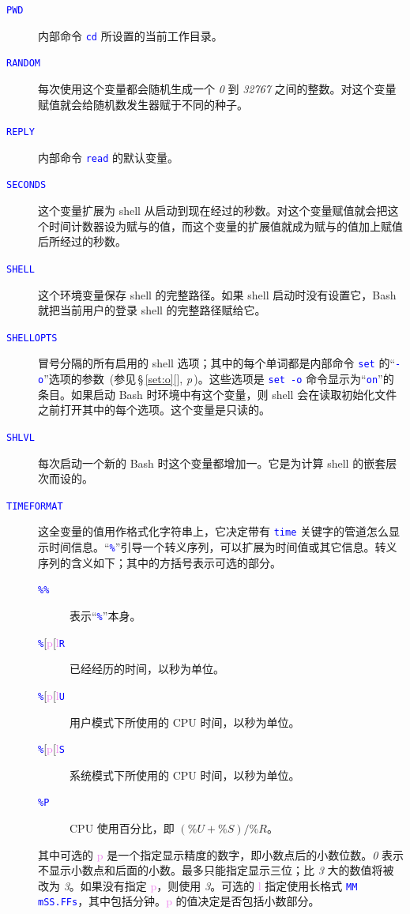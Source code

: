 \documentclass[openany,notitlepage]{book}
\newcommand{\code}[1]{\textcolor{blue}{{\tt #1}}}
\newcommand{\hl}[1]{{\sl #1}}
\newcommand{\hs}[1]{{\textcolor{violet}{#1}}}
\newcommand{\fullref}[1]{\,\S\,\ref{#1}[\nameref{#1}], \textit{p\pageref{#1}}\,}
\begin{document}
\begin{CJK}{UTF8}{song}
\begin{description}
    \item[\code{PWD}] 内部命令 \code{cd} 所设置的当前工作目录。
    \item[\code{RANDOM}] 每次使用这个变量都会随机生成一个 \hl{0} 到 \hl{32767} 之间的整数。对这个变量赋值就会给随机数发生器赋于不同的种子。
    \item[\code{REPLY}] 内部命令 \code{read} 的默认变量。
    \item[\code{SECONDS}] 这个变量扩展为 shell 从启动到现在经过的秒数。对这个变量赋值就会把这个时间计数器设为赋与的值，而这个变量的扩展值就成为赋与的值加上赋值后所经过的秒数。
    \item[\code{SHELL}] 这个环境变量保存 shell 的完整路径。如果 shell 启动时没有设置它，Bash 就把当前用户的登录 shell 的完整路径赋给它。
    \item[\code{SHELLOPTS}] 冒号分隔的所有启用的 shell 选项；其中的每个单词都是内部命令 \code{set} 的``\code{-o}''选项的参数~(参见\fullref{set:o})。这些选项是 \code{set -o} 命令显示为``\code{on}''的条目。如果启动 Bash 时环境中有这个变量，则 shell 会在读取初始化文件之前打开其中的每个选项。这个变量是只读的。
    \item[\code{SHLVL}] 每次启动一个新的 Bash 时这个变量都增加一。它是为计算 shell 的嵌套层次而设的。
    \item[\code{TIMEFORMAT}] 这全变量的值用作格式化字符串上，它决定带有 \code{time} 关键字的管道怎么显示时间信息。``\code{\%}''引导一个转义序列，可以扩展为时间值或其它信息。转义序列的含义如下；其中的方括号表示可选的部分。
    \begin{description}
        \item[\code{\%\%}] 表示``\code{\%}''本身。
        \item[\code{\%}[\hs{p}[\hs{l}\code{R}] 已经经历的时间，以秒为单位。
        \item[\code{\%}[\hs{p}[\hs{l}\code{U}] 用户模式下所使用的 CPU 时间，以秒为单位。
        \item[\code{\%}[\hs{p}[\hs{l}\code{S}] 系统模式下所使用的 CPU 时间，以秒为单位。
        \item[\code{\%P}] CPU 使用百分比，即 $(\%U + \%S) / \%R$。
    \end{description}
    其中可选的 \hs{p} 是一个指定显示精度的数字，即小数点后的小数位数。\hl{0} 表示不显示小数点和后面的小数。最多只能指定显示三位；比 \hl{3} 大的数值将被改为 \hl{3}。如果没有指定 \hs{p}，则使用 \hl{3}。可选的 \hs{l} 指定使用长格式 \code{MM mSS.FFs}，其中包括分钟。\hs{p} 的值决定是否包括小数部分。


\end{description}
\end{CJK}
\end{document}
